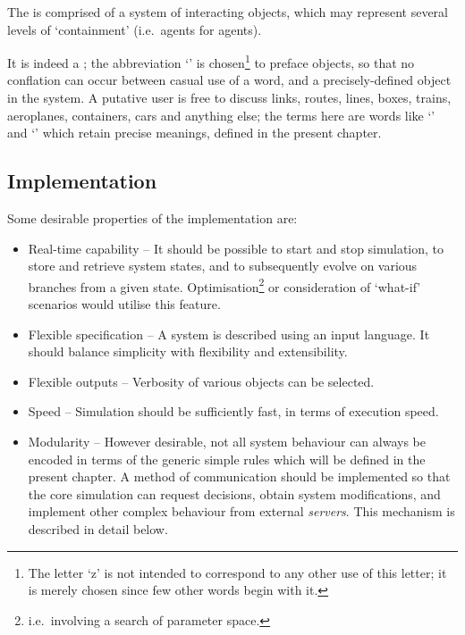 The  is comprised of a system of interacting objects, which
may represent several levels of `containment' (i.e.~agents for agents).

It is indeed a ; the abbreviation `' is
chosen\footnote{The letter `z' is not intended to correspond to any
  other use of this letter; it is merely chosen since few other words
  begin with it.} to preface objects, so that no
conflation can occur between casual use of a word, and a
precisely-defined object in the system. A putative user is free to discuss
links, routes, lines, boxes, trains, aeroplanes, containers, cars and
anything else; the terms here are words like `' and
`' which retain precise meanings, defined in the present
chapter.

\subsection{Implementation}
Some desirable properties of the implementation are:
\begin{itemize}
\item Real-time capability -- It should be possible to start and stop
  simulation, to store and retrieve system states, and to subsequently
  evolve on various branches from a given
  state. Optimisation\footnote{i.e.~involving a search of parameter
    space.} or consideration of `what-if' scenarios would utilise this feature.
\item Flexible specification -- A system is described using an input
  language. It should balance simplicity with flexibility and extensibility.
\item Flexible outputs -- Verbosity of various objects can be selected.
\item Speed -- Simulation should be sufficiently fast, in terms of execution speed.
  
\item Modularity -- However desirable, not all system behaviour can
  always be encoded in terms of the generic simple rules which will be
  defined in the present chapter. A method of communication should be
  implemented so that the core simulation can request decisions,
  obtain system modifications, and implement other complex behaviour
  from external \emph{servers}. This mechanism is described in detail below.
 
\end{itemize}

